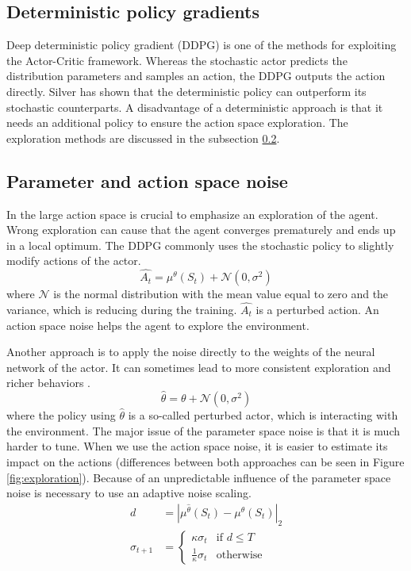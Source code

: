 \subsection{Deterministic policy gradients}
Deep deterministic policy gradient (DDPG) is one of the methods for exploiting the Actor-Critic framework. Whereas the stochastic actor predicts the distribution parameters and samples an action, the DDPG outputs the action directly. Silver \cite{silver2014} has shown that the deterministic policy can outperform its stochastic counterparts. A disadvantage of a deterministic approach is that it needs an additional policy to ensure the action space exploration. The exploration methods are discussed in the subsection \ref{sec:exploration}.

\subsection{Parameter and action space noise}
\label{sec:exploration}
In the large action space is crucial to emphasize an exploration of the agent. Wrong exploration can cause that the agent converges prematurely and ends up in a local optimum. The DDPG commonly uses the stochastic policy to slightly modify actions of the actor.
\begin{equation} \label{eq:exploration}
\hat{A_t} = \mu^\theta(S_t) + \mathcal{N}(0, \sigma^2)
\end{equation}
where $\mathcal{N}$ is the normal distribution with the mean value equal to zero and the variance, which is reducing during the training. $\hat{A_t}$ is a perturbed action. An action space noise helps the agent to explore the environment. \par Another approach is to apply the noise directly to the weights of the neural network of the actor. It can sometimes lead to more consistent exploration and richer behaviors \cite{plappert2017}.
\begin{equation}
\hat{\theta} = \theta + \mathcal{N}(0, \sigma^2)
\end{equation}
where the policy using $\hat{\theta}$ is a so-called perturbed actor, which is interacting with the environment. 
\clearpage
The major issue of the parameter space noise is that it is much harder to tune. When we use the action space noise, it is easier to estimate its impact on the actions (differences between both approaches can be seen in Figure \ref{fig:exploration}). Because of an unpredictable influence of the parameter space noise is necessary to use an adaptive noise scaling.
\begin{align}
d &= |\mu^{\hat{\theta}}(S_t) - \mu^\theta(S_t)|_2  \\
\sigma_{t+1} &= 
     \begin{cases}
       \kappa \sigma_t & \text{if } d \leq T \\
       \frac{1}{\kappa}\sigma_t & \text{otherwise}
     \end{cases}
\end{align}
